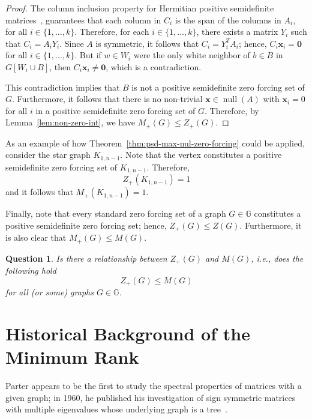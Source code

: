 \documentclass{article}
\newtheorem{question}[theorem]{Question}
\theoremstyle{definition}
\newcommand\kernel[1]{\operatorname{null}\left(#1\right)}
\begin{document}
\begin{proof}
The column inclusion property for Hermitian positive semidefinite matrices~\cite{Johnson1998}, guarantees that each column in $C_{i}$ is the span of the columns in $A_{i}$, for all $i\in\{1,\ldots,k\}$.
Therefore, for each $i\in\{1,\ldots,k\}$, there exists a matrix $Y_{i}$ such that $C_{i}=A_{i}Y_{i}$.
Since $A$ is symmetric, it follows that $C_{i}=Y_{i}^{T}A_{i}$; hence, $C_{i}\textbf{x}_{i}=\textbf{0}$ for all $i\in\{1,\ldots,k\}$.
But if $w\in W_{i}$ were the only white neighbor of $b\in B$ in $G[W_{i}\cup B]$, then $C_{i}\textbf{x}_{i}\neq \textbf{0}$, which is a contradiction. 

This contradiction implies that $B$ is not a positive semidefinite zero forcing set of $G$.
Furthermore, it follows that there is no non-trivial $\textbf{x}\in\kernel{A}$ with $\textbf{x}_{i}=0$ for all $i$ in a positive semidefinite zero forcing set of $G$.
Therefore, by Lemma~\ref{lem:non-zero-int}, we have $M_{+}(G)\leq Z_{+}(G)$.
\end{proof}

As an example of how Theorem~\ref{thm:psd-max-nul-zero-forcing} could be applied, consider the star graph $K_{1,n-1}$. 
Note that the  vertex constitutes a positive semidefinite zero forcing set of $K_{1,n-1}$.
Therefore, 
\[
Z_{+}(K_{1,n-1}) = 1
\]
and it follows that $M_{+}(K_{1,n-1}) = 1$.

Finally, note that every standard zero forcing set of a graph $G\in\mathbb{G}$ constitutes a positive semidefinite zero forcing set; hence, $Z_{+}(G)\leq Z(G)$.
Furthermore, it is also clear that $M_{+}(G)\leq M(G)$.
\begin{question}
Is there a relationship between $Z_{+}(G)$ and $M(G)$, i.e., does the following hold
\[
Z_{+}(G) \leq M(G)
\]
for all (or some) graphs $G\in\mathbb{G}$.
\end{question}

\section{Historical Background of the Minimum Rank}
Parter appears to be the first to study the spectral properties of matrices with a given graph; in 1960, he published his investigation of sign symmetric matrices with multiple eigenvalues whose underlying graph is a tree~\cite{Parter1960}.
\end{document}
